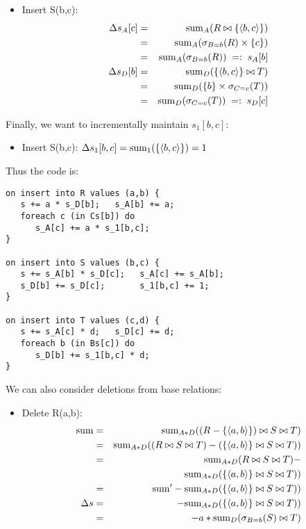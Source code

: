 {\begin{example}
\begin{itemize}
(Analogously insert T(c,d) for maintaining $s_{D}[b], s_{D}[c]$.)

\item
Insert S(b,c):
\begin{eqnarray*}
\Delta s_A[c] &=&
\mathrm{sum}_{A}(R \bowtie \{{\langle b,c\rangle}\})
\\ &=&
\mathrm{sum}_{A}(\sigma_{B=b}(R) \times \{c\})
\\ &=&
\mathrm{sum}_{A}(\sigma_{B=b}(R))
\;=:\; s_A[b]
\\
\Delta s_D[b] &=&
\mathrm{sum}_{D}(\{{\langle b,c\rangle}\} \bowtie T)
\\ &=&
\mathrm{sum}_{D}(\{b\} \times \sigma_{C=c}(T))
\\ &=&
\mathrm{sum}_{D}(\sigma_{C=c}(T))
\;=:\; s_D[c]
\end{eqnarray*}
\end{itemize}

Finally, we want to incrementally maintain $s_1[b,c]$:
\begin{itemize}
\item
Insert S(b,c):
$
\Delta s_1[b,c] =
\mathrm{sum}_{1}(\{{\langle b,c\rangle}\}) = 1
$
\end{itemize}

Thus the code is:
\begin{verbatim}
on insert into R values (a,b) {
   s += a * s_D[b];   s_A[b] += a;
   foreach c (in Cs[b]) do
      s_A[c] += a * s_1[b,c];
}

on insert into S values (b,c) {
   s += s_A[b] * s_D[c];   s_A[c] += s_A[b];
   s_D[b] += s_D[c];       s_1[b,c] += 1;
}

on insert into T values (c,d) {
   s += s_A[c] * d;   s_D[c] += d;
   foreach b (in Bs[c]) do
      s_D[b] += s_1[b,c] * d;
}
\end{verbatim}

We can also consider deletions from base relations:
\begin{itemize}
\item
Delete R(a,b):
\begin{eqnarray*}
\mathrm{sum} &=& \mathrm{sum}_{A*D}((R-\{{\langle a,b\rangle}\}) \bowtie S \bowtie T)\\
&=& \mathrm{sum}_{A*D}((R \bowtie S \bowtie T) -
(\{{\langle a,b\rangle}\} \bowtie S \bowtie T))\\
&=& \mathrm{sum}_{A*D}(R \bowtie S \bowtie T) -\\
& & \mathrm{sum}_{A*D}(\{{\langle a,b\rangle}\} \bowtie S \bowtie T))\\
&=& \mathrm{sum}' - \mathrm{sum}_{A*D}(\{{\langle a,b\rangle}\} \bowtie S \bowtie T))\\
\Delta s &=&  - \mathrm{sum}_{A*D}(\{{\langle a,b\rangle}\} \bowtie S \bowtie T))\\
&=& -a*\mathrm{sum}_{D}(\sigma_{B=b}(S) \bowtie T)
\end{eqnarray*} 
\end{itemize}


\end{example}}
